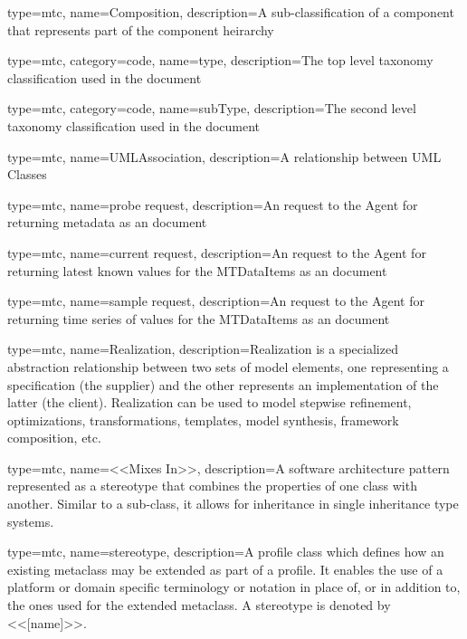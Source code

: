 {
  type=mtc,
  name=Composition,
  description={A sub-classification of a component that represents part of the component heirarchy}
}

{
  type=mtc,
  category=code,
  name=type,
  description={The top level taxonomy classification used in the  document}
}

{
  type=mtc,
  category=code,
  name=subType,
  description={The second level taxonomy classification used in the  document}
}

{
  type=mtc,
  name=UMLAssociation,
  description={A relationship between UML Classes}
}

{
  type=mtc,
  name={probe request},
  description={An  request to the \gls{Agent} for returning metadata as an   document}
}

{
  type=mtc,
  name={current request},
  description={An  request to the \gls{Agent} for returning latest known values for the \glspl{MTDataItem} as an   document}
}

{
  type=mtc,
  name={sample request},
  description={An  request to the \gls{Agent} for returning time series of values for the \glspl{MTDataItem} as an   document}
}

{
  type=mtc,
  name=Realization,
  description={Realization is a specialized abstraction relationship between two sets of model elements, one representing a specification (the supplier) and the other represents an implementation of the latter (the client). Realization can be used to model stepwise refinement, optimizations, transformations, templates, model synthesis, framework composition, etc.}
}

{
  type=mtc,
  name={<<Mixes In>>},
  description={A software architecture pattern represented as a \gls{stereotype} that combines the properties of one class with another. Similar to a sub-class, it allows for inheritance in single inheritance type systems.}
}

{
  type=mtc,
  name=stereotype,
  description={A profile class which defines how an existing metaclass may be extended as part of a profile. It enables the use of a platform or domain specific terminology or notation in place of, or in addition to, the ones used for the extended metaclass. A stereotype is denoted by <<[name]>>.}
}

